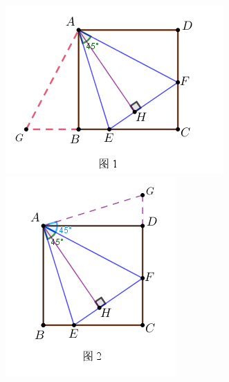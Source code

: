 \begin{figure}[htp]
	 \begin{minipage}{0.5\linewidth}
		 \centering
		 \includegraphics[scale=0.8]{figure/banjiao02.png}
		 \end{minipage}
	 \begin{minipage}{0.5\linewidth}
		 \centering
		 \includegraphics[scale=0.8]{figure/banjiao03.png}
		 \end{minipage}
	 \end{figure}
